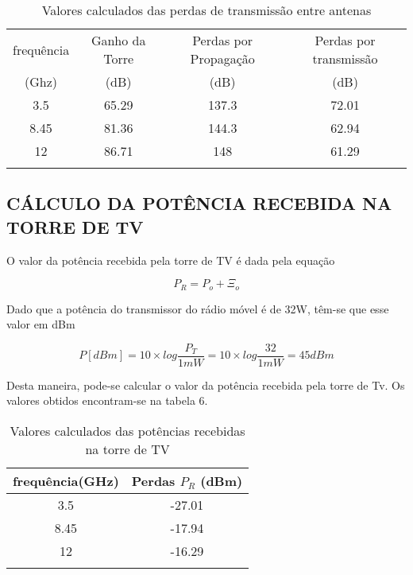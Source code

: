 \documentclass[a4paper,12pt]{article}
\begin{document}
\begin{table}[!h]
  \begin{center}
    \caption{Valores calculados das perdas de transmissão entre antenas} 
    \begin{tabular}{p{1in} p{1in} p{1in} p{1in}}\hline \hline
      \multicolumn{1}{c}{frequência} & \multicolumn{1}{c}{Ganho da Torre} & \multicolumn{1}{c}{Perdas por Propagação} & \multicolumn{1}{c}{Perdas por transmissão} \\ 
      \multicolumn{1}{c}{(Ghz)} & \multicolumn{1}{c}{(dB)} & \multicolumn{1}{c}{(dB)} & \multicolumn{1}{c}{(dB)} \\ \hline
      \multicolumn{1}{c}{3.5} & \multicolumn{1}{c}{65.29} & \multicolumn{1}{c}{137.3} & \multicolumn{1}{c}{72.01} \\ 
      \multicolumn{1}{c}{8.45} & \multicolumn{1}{c}{81.36} & \multicolumn{1}{c}{144.3} & \multicolumn{1}{c}{62.94} \\ 
      \multicolumn{1}{c}{12} & \multicolumn{1}{c}{86.71} & \multicolumn{1}{c}{148} & \multicolumn{1}{c}{61.29} \\ \hline
      &
    \end{tabular}
  \end{center}
\end{table}

\subsection{CÁLCULO DA POTÊNCIA RECEBIDA NA TORRE DE TV}
O valor da potência recebida pela torre de TV é dada pela equação

\begin{equation}
 P_R = P_o + \Xi _o
\end{equation}

Dado que a potência do transmissor do rádio móvel é de 32W, têm-se que esse
valor em dBm 

\begin{equation}
P[dBm]= 10 \times log\dfrac{P_T}{1mW} = 10 \times log\frac{32}{1mW} = 45dBm 
\end{equation}

Desta maneira, pode-se calcular o valor da potência recebida pela torre de Tv. Os
valores obtidos encontram-se na tabela 6.

\begin{table}[!h]
  \begin{center}
    \caption{Valores calculados das potências recebidas na torre de TV} 
    \begin{tabular}{p{3in} p{3in}}\hline \hline
      \multicolumn{1}{c}{frequência(GHz)} & \multicolumn{1}{c}{Perdas $P_R$ (dBm)}\\ \hline
      \multicolumn{1}{c}{3.5} & \multicolumn{1}{c}{-27.01} \\ 
      \multicolumn{1}{c}{8.45} & \multicolumn{1}{c}{-17.94} \\ 
      \multicolumn{1}{c}{12} & \multicolumn{1}{c}{-16.29}\\ \hline
      &
    \end{tabular}
  \end{center}
\end{table}
\end{document}

